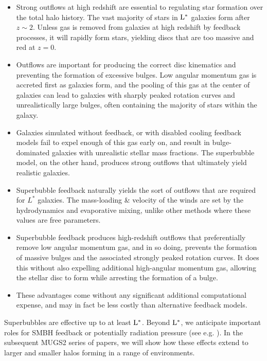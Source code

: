 \begin{itemize}
    \item Strong outflows at high redshift are essential to regulating
        star formation over the total halo history.  The vast majority of stars
        in $\rm{L^*}$ galaxies form after $z\sim2$.  Unless gas is removed from
        galaxies at high redshift by feedback processes, it will rapidly form
        stars, yielding discs that are too massive and red at $z=0$.
    \item Outflows are important for producing the correct disc kinematics and
        preventing the formation of excessive bulges.  Low angular momentum gas
        is accreted first as galaxies form, and the pooling of this gas at the
        center of galaxies can lead to galaxies with sharply peaked rotation
        curves and unrealistically large bulges, often containing the majority
        of stars within the galaxy.  
    \item Galaxies simulated without feedback, or with disabled cooling feedback
        models fail to expel enough of this gas early on, and result in
        bulge-dominated galaxies with unrealistic stellar mass fractions.  The
        superbubble model, on the other hand, produces strong outflows that
        ultimately yield realistic galaxies.
    \item Superbubble feedback naturally yields the sort of outflows that are
        required for $L^*$ galaxies.  The mass-loading \& velocity of
        the winds are set by the hydrodynamics and evaporative mixing, unlike
        other methods where these values are free parameters.
    \item Superbubble feedback produces high-redshift outflows that
        preferentially remove low angular momentum gas, and in so doing,
        prevents the formation of massive bulges and the associated strongly
        peaked rotation curves. It does this without also expelling additional
        high-angular momentum gas, allowing the stellar disc to form while
        arresting the formation of a bulge.
    \item These advantages come without any significant additional computational
        expense, and may in fact be less costly than alternative feedback
        models.
\end{itemize}

Superbubbles are effective up to at least $\rm{L^*}$.   Beyond $\rm{L^*}$, we
anticipate important roles for SMBH feedback or potentially radiation pressure
(see e.g.  \citealt{Hopkins2013}).  In the subsequent MUGS2 series of papers, we
will show how these effects extend to larger and smaller halos forming in a
range of environments.

